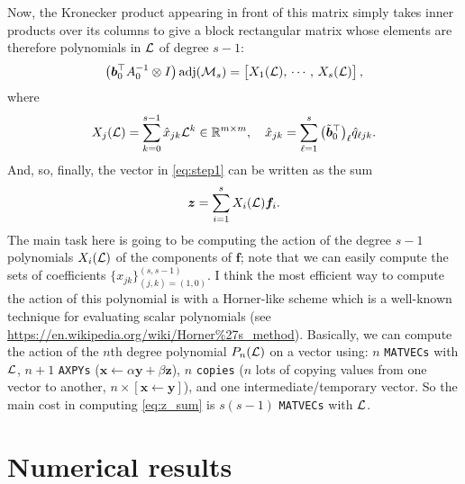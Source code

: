 \documentclass[review]{siamart}
\newcommand{\madj}{\operatorname{adj}}
\begin{document}
Now, the Kronecker product appearing in front of this matrix simply takes inner products over its columns to give a block rectangular matrix whose elements are therefore polynomials in ${\cal L}$ of degree $s-1$:
\begin{align}
\big( \bm{b}_0^\top A^{-1}_0 \otimes I \big) \madj({\cal M}_s) 
=
\begin{bmatrix}
X_{1}({\cal L}), \, \cdots, \, X_{s}({\cal L})
\end{bmatrix},
\end{align}
where
\begin{align}
X_{j}({\cal L}) = \sum \limits_{k = 0}^{s-1} \hat{x}_{j k} {\cal L}^k \in \mathbb{R}^{m \times m}, 
\quad
\hat{x}_{j k} = \sum \limits_{\ell = 1}^s \big( \tilde{\bm{b}}_0^\top \big)_{\ell} \hat{q}_{\ell j k}.
\end{align}
And, so, finally, the vector in \eqref{eq:step1} can be written as the sum
\begin{align} \label{eq:z_sum}
\bm{z} = \sum \limits_{i = 1}^s X_i({\cal L}) \bm{f}_i.
\end{align}
The main task here is going to be computing the action of the degree $s-1$ polynomials $X_i({\cal L})$ of the components of $\bm{f}$; note that we can  easily compute the sets of coefficients $\{ x_{jk} \}_{(j,k)=(1,0)}^{(s,s-1)}$. I think the most efficient way to compute the action of this polynomial is with a Horner-like scheme which is a well-known technique for evaluating scalar polynomials (see \url{https://en.wikipedia.org/wiki/Horner\%27s_method}). Basically, we can compute the action of the $n$th degree polynomial $P_n({\cal L})$ on a vector using: $n$ \texttt{MATVECs} with ${\cal L}$, $n+1$ \texttt{AXPYs} ($\bm{x} \gets \alpha \bm{y} + \beta \bm{z}$), $n$ \texttt{copies} ($n$ lots of copying values from one vector to another, $n \times [\bm{x} \gets \bm{y}]$), and one intermediate/temporary vector. So the main cost in computing \eqref{eq:z_sum} is $s(s-1)$ \texttt{MATVECs} with ${\cal L}$.




\section{Numerical results}\label{sec:numerics}
\end{document}
